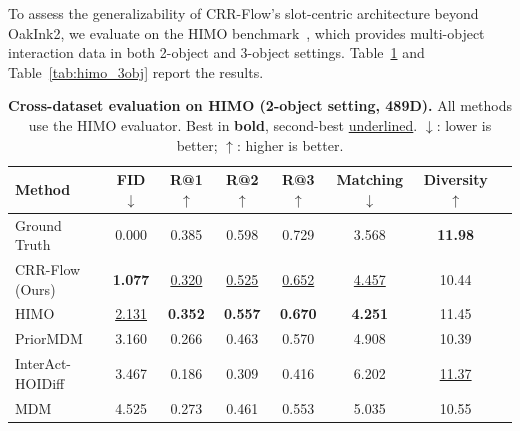 \documentclass[sigconf, screen, review, anonymous]{acmart}
\begin{document}
To assess the generalizability of CRR-Flow's slot-centric architecture beyond OakInk2, we evaluate on the HIMO benchmark~\cite{himo2024}, which provides multi-object interaction data in both 2-object and 3-object settings. Table~\ref{tab:himo_2obj} and Table~\ref{tab:himo_3obj} report the results.

\begin{table}[t]
  \caption{\textbf{Cross-dataset evaluation on HIMO (2-object setting, 489D).} All methods use the HIMO evaluator. Best in \textbf{bold}, second-best \underline{underlined}. $\downarrow$: lower is better; $\uparrow$: higher is better.}
  \label{tab:himo_2obj}
  \centering
  \small
  \begin{tabular}{@{}lccccccc@{}}
    \toprule
    Method & FID $\downarrow$ & R@1 $\uparrow$ & R@2 $\uparrow$ & R@3 $\uparrow$ & Matching $\downarrow$ & Diversity $\uparrow$ \\
    \midrule
    Ground Truth & 0.000 & 0.385 & 0.598 & 0.729 & 3.568 & \textbf{11.98} \\
    \midrule
    CRR-Flow (Ours)  & \textbf{1.077} & \underline{0.320} & \underline{0.525} & \underline{0.652} & \underline{4.457} & 10.44 \\
    HIMO & \underline{2.131} & \textbf{0.352} & \textbf{0.557} & \textbf{0.670} & \textbf{4.251} & 11.45 \\
    PriorMDM & 3.160 & 0.266 & 0.463 & 0.570 & 4.908 & 10.39 \\
    InterAct-HOIDiff& 3.467 & 0.186 & 0.309 & 0.416 & 6.202 & \underline{11.37} \\
    MDM & 4.525 & 0.273 & 0.461 & 0.553 & 5.035 & 10.55 \\
    \bottomrule
  \end{tabular}
\end{table}
\end{document}
